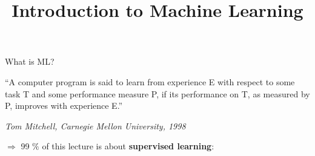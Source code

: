 \documentclass[11pt,compress,t,notes=noshow, xcolor=table]{beamer}
\title{Introduction to Machine Learning}
\date{}
\begin{document}
\sloppy


\begin{vbframe}{What is ML?}
    \item 
    ``A computer program is said to learn from experience E with respect to
  some task T and some performance measure P, if its performance on T, as 
  measured by P, improves with experience E.''\\
  \begin{footnotesize}
  \emph{Tom Mitchell, Carnegie Mellon University, 1998}\\
  \end{footnotesize}

\vspace{1ex}

$\Rightarrow$ 99 $\%$ of this lecture is about \textbf{supervised learning}: 


\end{vbframe}
\end{document}
